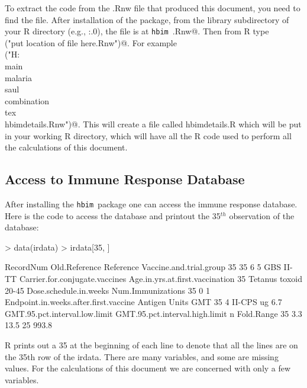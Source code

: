 \documentclass{article}[12pt]
\newcommand{\pname}{\texttt{hbim}}
\begin{document}
To extract the code from the .Rnw file that produced this document, you need to find the file. 
After installation of the package, from the library subdirectory of your R directory (e.g., 
\verb@C:\R{}.0\library@), the file is at \pname\ \verb@\doc\inst\hbimdetails.Rnw@.
Then from R type \\
 \verb@Stangle("put location of file here\hbimdetails.Rnw")@. For example \\
\verb@Stangle("H:\\main\\malaria\\saul\\combination\\tex\\hbimdetails.Rnw")@. 
This will create a file called hbimdetails.R which will be put in your working R directory, which will have all the 
R code used to perform all the calculations of this document. 

\subsection{Access to Immune Response Database}

After installing the \pname\ package one can access the immune response database. Here is the code to 
access the database and printout the 35$^{th}$ observation of the database:
\begin{Schunk}
\begin{Sinput}
> data(irdata)
> irdata[35, ]
\end{Sinput}
\begin{Soutput}
   RecordNum Old.Reference Reference Vaccine.and.trial.group
35        35             6         5               GBS II-TT
   Carrier.for.conjugate.vaccines Age.in.yrs.at.first.vaccination
35                 Tetanus toxoid                           20-45
   Dose.schedule.in.weeks Num.Immunizations
35                      0                 1
   Endpoint.in.weeks.after.first.vaccine Antigen Units GMT
35                                     4  II-CPS    ug 6.7
   GMT.95.pct.interval.low.limit GMT.95.pct.interval.high.limit  n Fold.Range
35                           3.3                           13.5 25      993.8
\end{Soutput}
\end{Schunk}
R prints out a 35 at  the beginning of each line to denote that all the lines are on the 35th row of the irdata. 
There are many variables, and some are missing values. For the calculations of this document we are concerned with only 
a few variables. 
\end{document}
